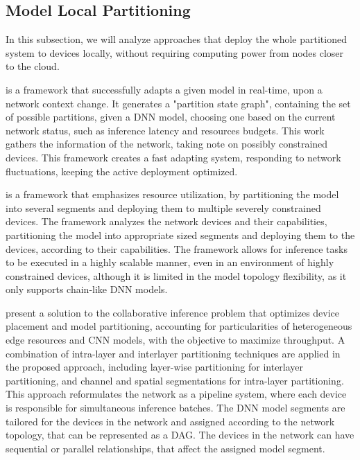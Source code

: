 \subsection{Model Local Partitioning} \label{sec:se313}

In this subsection, we will analyze approaches that deploy the whole partitioned
system to devices locally, without requiring computing power from nodes closer
to the cloud.

\begin{description}[style=unboxed, leftmargin=1cm, font=\bfseries]

    \item[CAS \cite{wang_context-aware_2021}]
    is a framework that successfully adapts a given model in real-time, upon a
    network context change. It generates a "partition state graph", containing 
    the set of possible partitions, given a
    \ac{DNN} model, choosing one based on the current network status, such as 
    inference latency and resources budgets. This work gathers the information
    of the network, taking note on possibly constrained devices. This framework
    creates a fast adapting system, responding to network fluctuations, keeping 
    the active deployment optimized.

    \item[NAMP \cite{rego::namp}]
    is a framework that emphasizes resource utilization, by partitioning the
    model into several segments and deploying them to multiple severely
    constrained devices. The framework analyzes the network devices and their
    capabilities, partitioning the model into appropriate sized segments and
    deploying them to the devices, according to their capabilities. 
    The framework allows for inference tasks to be
    executed in a highly scalable manner, even in an environment of highly
    constrained devices, although it is limited in the model topology
    flexibility, as it only supports chain-like \ac{DNN} models. 

    \item[\textcite{p_dai_joint_2025}] 
    present a solution to the collaborative inference problem that optimizes
    device placement and model partitioning, accounting for particularities of 
    heterogeneous edge resources and \ac{CNN} models, with the objective to
    maximize throughput.
    A combination of intra-layer and interlayer partitioning techniques are 
    applied in the proposed approach, including layer-wise partitioning for 
    interlayer partitioning, and channel and spatial segmentations
    for intra-layer partitioning.
    This approach reformulates the network as 
    a pipeline system, where each device is responsible for simultaneous 
    inference batches. The \ac{DNN} model segments are tailored for the devices 
    in the network and assigned according to the network topology, that can be 
    represented as a \ac{DAG}. The devices in the network can have sequential 
    or parallel relationships, that affect the assigned model segment.


\end{description}
